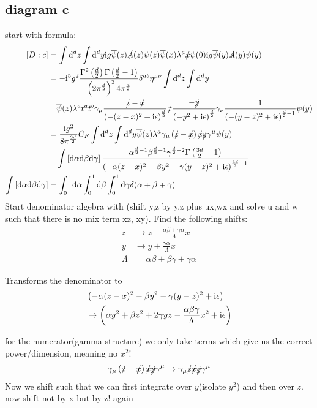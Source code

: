 \subsection{diagram c}
start with formula: 
\begin{align}
	\left[D:c\right]&=
	\int \text{d}^d z \int \text{d}^d y \text{i} g \overline\psi(z) \slashed A(z) \psi(z) \overline\psi(x) \lambda^a\slashed x \psi(0)  \text{i} g  \overline\psi(y) \slashed A (y) \psi(y)
	\\
	&=
	-\text{i}^5 g^2 \frac{\Gamma^2\left(\frac{d}{2}\right)\Gamma\left(\frac{d}{2}-1\right)}{\left(2\pi^{\frac{d}{2}}\right)^2 4\pi^{\frac{d}{2}}}\delta^{ab} \eta^{\mu \nu} \int \text{d}^d z \int \text{d}^d y 
	\\&~~~
	\overline\psi(z) \lambda^a t^a t^b \gamma_\mu \frac{\slashed z - \slashed x}{\left(-(z-x)^2 +\text{i} \epsilon\right)^{\frac{d}{2}}}\slashed x \frac{-\slashed y}{\left(-y^2+\text{i} \epsilon\right)^{\frac{d}{2}}}\gamma_\nu \frac{1}{\left(-(y-z)^2+\text{i} \epsilon\right)^{\frac{d}{2}-1}} \psi(y)
	\\
	&=
	\frac{\text{i} g^2}{8\pi^{\frac{3d}{2}}} C_F \int \text{d}^d z \int \text{d}^d y \overline\psi(z) \lambda^a \gamma_\mu \left( \slashed z - \slashed x\right) \slashed x \slashed y \gamma^\mu \psi(y)
	\\&~~~
	\int \left[\text{d} \alpha \text{d} \beta \text{d} \gamma\right]  \frac{\alpha^{\frac{d}{2}-1}\beta^{\frac{d}{2}-1}\gamma^{\frac{d}{2}-2}\Gamma\left(\frac{3d}{2}-1\right)}{\left( -\alpha(z-x)^2 -\beta y^2 -\gamma(y-z)^2 +\text{i} \epsilon \right)^{\frac{3d}{2}-1}}
	\\
	\int \left[\text{d} \alpha \text{d} \beta \text{d} \gamma\right] 
	&=
	\int_0^1 \text{d} \alpha  \int_0^1 \text{d} \beta \int_0^1 \text{d} \gamma \delta(\alpha+\beta+\gamma) 
\end{align}
Start denominator algebra with \Mat(shift y,z by y,z plus ux,wx and solve u and w such that there is no mix term xz, xy). Find the following shifts:
\begin{align}
	z&\rightarrow z+ \frac{\alpha \beta + \gamma \alpha}{\Lambda} x 
	\\
	y&\rightarrow y+ \frac{\gamma \alpha}{\Lambda} x 
	\\
	\Lambda&= \alpha \beta + \beta \gamma + \gamma \alpha
\end{align}

Transforms the denominator to 
\begin{align}
	&\left( -\alpha(z-x)^2  -\beta y^2 -\gamma(y-z)^2 +\text{i} \epsilon \right) 
	\\
	&\rightarrow  \left( \alpha y^2 + \beta z^2 + 2\gamma yz -\frac{\alpha\beta\gamma}{\Lambda} x^2 + \text{i} \epsilon \right)
\end{align}

for the numerator(gamma structure) we only take terms which give us the correct power/dimension, meaning no $x^2$!
\begin{align}
	\gamma_\mu \left( \slashed z - \slashed x\right) \slashed x \slashed y \gamma^\mu 
	\rightarrow 
	\gamma_\mu \slashed z \slashed x \slashed y \gamma^\mu
\end{align}
Now we shift such that we can first integrate over $y$(isolate $y^2$) and then over $z$. now shift not by x but by z! again \Mat


